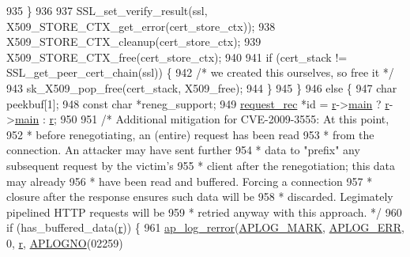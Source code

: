 \begin{DoxyCode}
{{935             \}
936 
937             SSL\_set\_verify\_result(ssl, X509\_STORE\_CTX\_get\_error(cert\_store\_ctx));
938             X509\_STORE\_CTX\_cleanup(cert\_store\_ctx);
939             X509\_STORE\_CTX\_free(cert\_store\_ctx);
940 
941             \textcolor{keywordflow}{if} (cert\_stack != SSL\_get\_peer\_cert\_chain(ssl)) \{
942                 \textcolor{comment}{/* we created this ourselves, so free it */}
943                 sk\_X509\_pop\_free(cert\_stack, X509\_free);
944             \}
945         \}
946         \textcolor{keywordflow}{else} \{
947             \textcolor{keywordtype}{char} peekbuf[1];
948             \textcolor{keyword}{const} \textcolor{keywordtype}{char} *reneg\_support;
949             \hyperlink{structrequest__rec}{request\_rec} *\textcolor{keywordtype}{id} = \hyperlink{group__APACHE__CORE__CONFIG_ga091cdd45984e865a888a4f8bb8fe107a}{r}->\hyperlink{structrequest__rec_aa15c110738953554b82619d8d2ee25b3}{main} ? \hyperlink{group__APACHE__CORE__CONFIG_ga091cdd45984e865a888a4f8bb8fe107a}{r}->\hyperlink{structrequest__rec_aa15c110738953554b82619d8d2ee25b3}{main} : \hyperlink{group__APACHE__CORE__CONFIG_ga091cdd45984e865a888a4f8bb8fe107a}{r};
950 
951             \textcolor{comment}{/* Additional mitigation for CVE-2009-3555: At this point,}
952 \textcolor{comment}{             * before renegotiating, an (entire) request has been read}
953 \textcolor{comment}{             * from the connection.  An attacker may have sent further}
954 \textcolor{comment}{             * data to "prefix" any subsequent request by the victim's}
955 \textcolor{comment}{             * client after the renegotiation; this data may already}
956 \textcolor{comment}{             * have been read and buffered.  Forcing a connection}
957 \textcolor{comment}{             * closure after the response ensures such data will be}
958 \textcolor{comment}{             * discarded.  Legimately pipelined HTTP requests will be}
959 \textcolor{comment}{             * retried anyway with this approach. */}
960             \textcolor{keywordflow}{if} (has\_buffered\_data(\hyperlink{group__APACHE__CORE__CONFIG_ga091cdd45984e865a888a4f8bb8fe107a}{r})) \{
961                 \hyperlink{group__APACHE__CORE__LOG_ga4c112558ccffd6b363da102b2052d2a6}{ap\_log\_rerror}(\hyperlink{group__APACHE__CORE__LOG_ga655e126996849bcb82e4e5a14c616f4a}{APLOG\_MARK}, \hyperlink{group__APACHE__CORE__LOG_ga57ad94ed8c92c4306de90479251a5d58}{APLOG\_ERR}, 0, 
      \hyperlink{group__APACHE__CORE__CONFIG_ga091cdd45984e865a888a4f8bb8fe107a}{r}, \hyperlink{group__APACHE__CORE__LOG_ga1dee8a07e06bc5b3de8b89662c2cd666}{APLOGNO}(02259)
}}
\end{DoxyCode}
